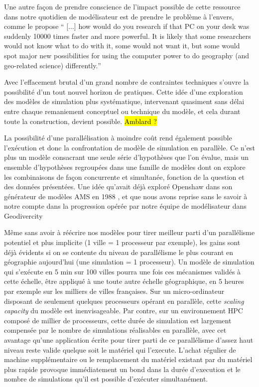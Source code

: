 Une autre façon de prendre conscience de l'impact possible de cette ressource dans notre quotidien de modélisateur est de prendre le problème à l'envers, comme le propose \textcite{Openshaw2000}  \foreignquote{english}{ [...] how would do you research if that PC on your desk was suddenly 10000 times faster and more powerful. It is likely that some researchers would not know what to do with it, some would not want it, but some would spot major new possibilities for using the computer power to do geography (and geo-related science) differently.}

Avec l'effacement brutal d'un grand nombre de contraintes techniques s'ouvre la possibilité d'un tout nouvel horizon de pratiques. Cette idée d'une exploration des modèles de simulation plus systématique, intervenant quasiment sans délai entre chaque remaniement conceptuel ou technique du modèle, et cela durant toute la construction, devient possible. \hl{Amblard ?}

La possibilité d'une parallélisation à moindre coût rend également possible l'exécution et donc la confrontation de modèle de simulation en parallèle. Ce n'est plus un modèle consacrant une seule série d'hypothèses que l'on évalue, mais un ensemble d'hypothèses regroupées dans une famille de modèles dont on explore les combinaisons de façon concurrente et simultanée, fonction de la question et des données présentées. Une idée qu'avait déjà exploré Openshaw dans son générateur de modèles AMS en 1988 \autocite{Openshaw1988}, et que nous avons reprise sans le savoir à notre compte dans la progression opérée par notre équipe de modélisateur dans Geodivercity \autocite{Cottineau2014b}

Même sans avoir à réécrire nos modèles pour tirer meilleur parti d'un parallélisme potentiel et plus implicite (1 ville = 1 processeur par exemple), les gains sont déjà évidents si on se contente du niveau de parallélisme le plus courant en géographie aujourd'hui (une simulation = 1 processeur). Un modèle de simulation qui s’exécute en 5 min sur 100 villes pourra une fois ces mécanismes validés à cette échelle, être appliqué à une toute autre échelle géographique, en 5 heures par exemple sur les milliers de villes françaises. Sur un micro-ordinateur disposant de seulement quelques processeurs opérant en parallèle, cette \textit{scaling capacity} du modèle est inenvisageable. Par contre, sur un environnement HPC composé de millier de processeurs, cette durée de simulation est largement compensée par le nombre de simulations réalisables en parallèle, avec cet avantage qu'une application écrite pour tirer parti de ce parallélisme d'assez haut niveau reste valide quelque soit le matériel qui l'execute. L'achat régulier de machine supplémentaire ou le remplacement du matériel existant par du matériel plus rapide provoque immédiatement un bond dans la durée d'execution et le nombre de simulations qu'il est possible d'exécuter simultanément.

